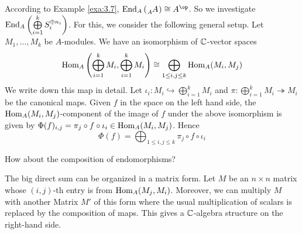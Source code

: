 \documentclass[twoside = false,	%
		headsepline,		%
		parskip = true,
		]{scrbook}						%
\begin{document}
        According to Example \ref{exa:3.7}, $\End_A\round{\tensor[_A]{A}{}} \cong A^\op$. So we investigate $\mathrm{End}_A\left( \bigoplus\limits_{i=1}^k S_i^{\oplus n_i}\right)$. For this, we consider the following general setup. Let $M_1,\dots,M_k$ be $A$-modules. We have an isomorphism of $\mathbb C$-vector spaces
        \begin{equation*}
            \mathrm{Hom}_A\left( \bigoplus_{i=1}^k M_i,\bigoplus_{i=1}^k M_i\right) \cong \bigoplus_{1 \leq i,j \leq k} \mathrm{Hom}_A(M_i,M_j)
        \end{equation*}
        We write down this map in detail. Let $\iota_i: M_i \hookrightarrow \bigoplus_{i=1}^k M_i$ and $\pi: \bigoplus_{i=1}^k M_i \twoheadrightarrow M_i$ be the canonical maps. Given $f$ in the space on the left hand side, the $\mathrm{Hom}_A(M_i,M_j)$-component of the image of $f$ under the above isomorphism is given by $\Phi(f)_{i,j} = \pi_j \circ f \circ \iota_i \in \mathrm{Hom}_A(M_i,M_j)$. Hence
        \begin{equation*}
            \Phi(f) = \bigoplus_{1 \leq i,j \leq k} \pi_j \circ f \circ \iota_i
        \end{equation*}

        How about the composition of endomorphisms?

        The big direct sum can be organized in a matrix form. Let $M$ be an $n \times n$ matrix whose $(i,j)$-th entry is from $\mathrm{Hom}_A(M_j,M_i)$. Moreover, we can multiply $M$ with another Matrix $M'$ of this form where the usual multiplication of scalars is replaced by the composition of maps. This gives a $\mathbb C$-algebra structure on the right-hand side.
\end{document}
